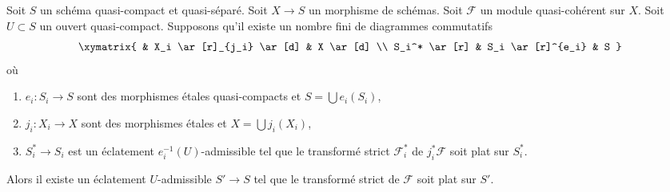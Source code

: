 \begin{lemma}
\label{lemma-flatten-module-etale-localize}
Soit $S$ un schéma quasi-compact et quasi-séparé.
Soit $X \to S$ un morphisme de schémas.
Soit $\mathcal{F}$ un module quasi-cohérent sur $X$.
Soit $U \subset S$ un ouvert quasi-compact.
Supposons qu'il existe un nombre fini de diagrammes commutatifs
$$
\xymatrix{
& X_i \ar[r]_{j_i} \ar[d] & X \ar[d] \\
S_i^* \ar[r] & S_i \ar[r]^{e_i} & S
}
$$
où
\begin{enumerate}
\item $e_i : S_i \to S$ sont des morphismes \'etales quasi-compacts et
$S = \bigcup e_i(S_i)$,
\item $j_i : X_i \to X$ sont des morphismes \'etales et
$X = \bigcup j_i(X_i)$,
\item $S^*_i \to S_i$ est un éclatement $e_i^{-1}(U)$-admissible
tel que le transformé strict $\mathcal{F}_i^*$ de $j_i^*\mathcal{F}$
soit plat sur $S^*_i$.
\end{enumerate}
Alors il existe un éclatement $U$-admissible $S' \to S$ tel que
le transformé strict de $\mathcal{F}$ soit plat sur $S'$.
\end{lemma}

